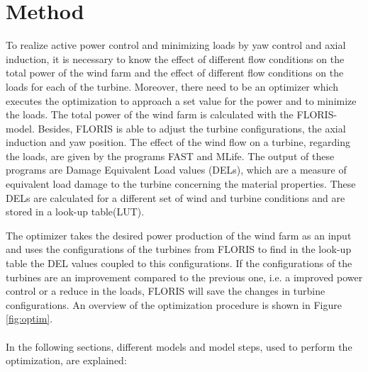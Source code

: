 \section{Method}
\label{sec:method}
	
	To realize active power control and minimizing loads by yaw control and axial induction, it is necessary to know the effect of different flow conditions on the total power of the wind farm and the effect of different flow conditions on the loads for each of the turbine. Moreover, there need to be an optimizer which executes the optimization to approach a set value for the power and to minimize the loads.\newline
	The total power of the wind farm is calculated with the FLORIS-model. Besides, FLORIS is able to adjust the turbine configurations, the axial induction and yaw position.  
	The effect of the wind flow on a turbine, regarding the loads, are given by the programs FAST and MLife. The output of these programs are Damage Equivalent Load values (DELs), which are a measure of equivalent load damage to the turbine concerning the material properties.\cite{Chougule2016} These DELs are calculated for a different set of wind and turbine conditions and are stored in a look-up table(LUT).
	
	The optimizer takes the desired power production of the wind farm as an input and uses the configurations of the turbines from FLORIS to find in the look-up table the DEL values coupled to this configurations. If the configurations of the turbines are an improvement compared to the previous one, i.e. a improved power control or a reduce in the loads, FLORIS will save the changes in turbine configurations. An overview of the optimization procedure is shown in Figure \ref{fig:optim}. 
	\\
	\\
	In the following sections, different models and model steps, used to perform the optimization, are explained:
	
	
	
